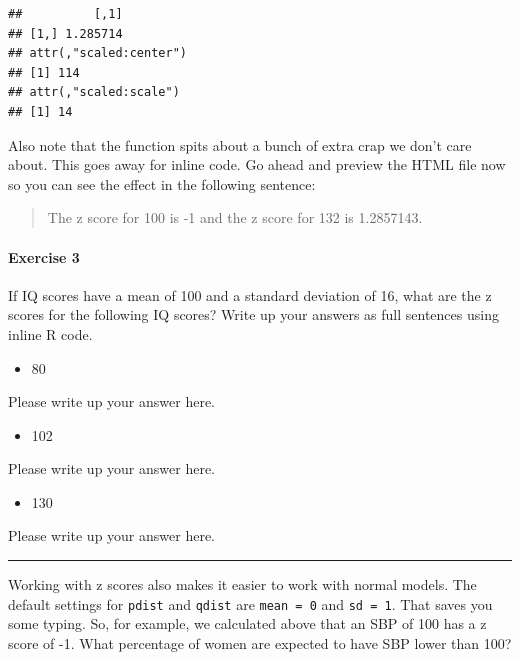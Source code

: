 \documentclass[
]{book}
\providecommand{\tightlist}{%
  \setlength{\itemsep}{0pt}\setlength{\parskip}{0pt}}
\begin{document}
\begin{verbatim}
##          [,1]
## [1,] 1.285714
## attr(,"scaled:center")
## [1] 114
## attr(,"scaled:scale")
## [1] 14
\end{verbatim}

Also note that the function spits about a bunch of extra crap we don't care about. This goes away for inline code. Go ahead and preview the HTML file now so you can see the effect in the following sentence:

\begin{quote}
The z score for 100 is -1 and the z score for 132 is 1.2857143.
\end{quote}

\hypertarget{exercise-3-8}{%
\paragraph*{Exercise 3}\label{exercise-3-8}}

If IQ scores have a mean of 100 and a standard deviation of 16, what are the z scores for the following IQ scores? Write up your answers as full sentences using inline R code.

\begin{itemize}
\tightlist
\item
  80
\end{itemize}

Please write up your answer here.

\begin{itemize}
\tightlist
\item
  102
\end{itemize}

Please write up your answer here.

\begin{itemize}
\tightlist
\item
  130
\end{itemize}

Please write up your answer here.

\begin{center}\rule{0.5\linewidth}{0.5pt}\end{center}

Working with z scores also makes it easier to work with normal models. The default settings for \texttt{pdist} and \texttt{qdist} are \texttt{mean\ =\ 0} and \texttt{sd\ =\ 1}. That saves you some typing. So, for example, we calculated above that an SBP of 100 has a z score of -1. What percentage of women are expected to have SBP lower than 100?
\end{document}
